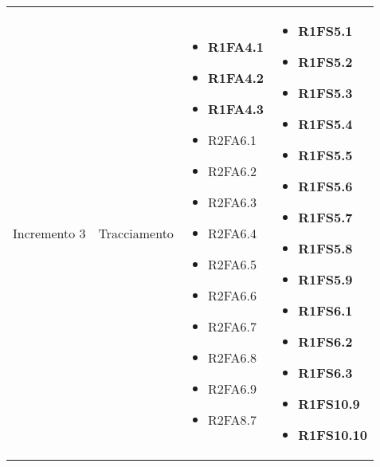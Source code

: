 {\begin{longtable}{C{3cm} C{4cm} C{4cm} C{4cm}}
Incremento 3 & Tracciamento & \begin{itemize}
    \item[ ] \textbf{R1FA4.1}
    \item[ ] \textbf{R1FA4.2}
    \item[ ] \textbf{R1FA4.3}
    \item[ ] R2FA6.1
    \item[ ] R2FA6.2
    \item[ ] R2FA6.3
    \item[ ] R2FA6.4
    \item[ ] R2FA6.5
    \item[ ] R2FA6.6
    \item[ ] R2FA6.7
    \item[ ] R2FA6.8 
    \item[ ] R2FA6.9
    \item[ ] R2FA8.7
\end{itemize} & \begin{itemize} 
    \item[ ] \textbf{R1FS5.1}
    \item[ ] \textbf{R1FS5.2}
    \item[ ] \textbf{R1FS5.3}
    \item[ ] \textbf{R1FS5.4}
    \item[ ] \textbf{R1FS5.5}
    \item[ ] \textbf{R1FS5.6}
    \item[ ] \textbf{R1FS5.7}
    \item[ ] \textbf{R1FS5.8}
    \item[ ] \textbf{R1FS5.9}
    \item[ ] \textbf{R1FS6.1}
    \item[ ] \textbf{R1FS6.2}
    \item[ ] \textbf{R1FS6.3}
    \item[ ] \textbf{R1FS10.9}
    \item[ ] \textbf{R1FS10.10}
\end{itemize}\\


\end{longtable}}
